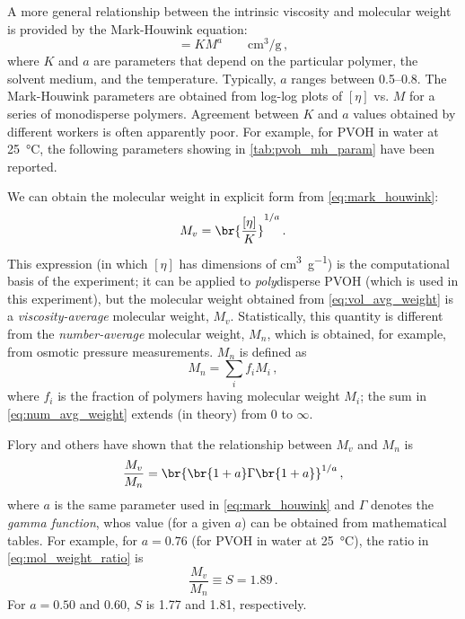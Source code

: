 \documentclass[nobib,nofonts,nols,nohyper]{tufte-handout}
\begin{document}
A more general relationship between the intrinsic viscosity and molecular weight is provided by the Mark-Houwink equation:
\begin{equation}
	[\eta] = K M^a \qquad \si{\cm\cubed \per \g} \, ,
	\label{eq:mark_houwink}
\end{equation}
where \( K \) and \( a \) are parameters that depend on the particular polymer, the solvent medium, and the temperature. 
Typically, \( a \) ranges between \numrange{0.5}{0.8}. 
The Mark-Houwink parameters are obtained from log-log plots of \( [\eta] \) vs. \( M \) for a series of monodisperse polymers. 
Agreement between \( K \) and \( a \) values obtained by different workers is often apparently poor.\cite{immergut75} 
For example, for PVOH in water at \SI{25}{\celsius}, the following parameters showing in \cref{tab:pvoh_mh_param} have been reported. 

We can obtain the molecular weight in explicit form from \cref{eq:mark_houwink}:
\begin{equation}
	M_v = \br{\frac{[\eta]}{K}}^{1/a} \, .
	\label{eq:vol_avg_weight}
\end{equation}
This expression (in which \( [\eta] \) has dimensions of \si{\cm\cubed \per \g}) is the computational basis of the experiment; it can be applied to \emph{poly}disperse PVOH (which is used in this experiment), but the molecular weight obtained from \cref{eq:vol_avg_weight} is a \emph{viscosity-average} molecular weight, \( M_v \). 
Statistically, this quantity is different from the \emph{number-average} molecular weight, \( M_n \), which is obtained, for example, from osmotic pressure measurements. 
\( M_n \) is defined as 
\begin{equation}
	M_n = \sum_i f_i M_i \, ,
	\label{eq:num_avg_weight}
\end{equation}
where \( f_i \) is the fraction of polymers having molecular weight \( M_i \); the sum in \cref{eq:num_avg_weight} extends (in theory) from \num{0} to \( \infty \). 

Flory and others\cite{schaefgen48} have shown that the relationship between \( M_v \) and \( M_n \) is
\begin{equation}
	\frac{M_v}{M_n} = \br{\br{1 + a} \Gamma\br{1 + a}}^{1/a} \, ,
	\label{eq:mol_weight_ratio}
\end{equation}
where \( a \) is the same parameter used in \cref{eq:mark_houwink} and \( \Gamma \) denotes the \emph{gamma function}, whos value (for a given \( a \)) can be obtained from mathematical tables. 
For example, for \( a = 0.76 \) (for PVOH in water at \SI{25}{\celsius}),\cite{flory48} the ratio in \cref{eq:mol_weight_ratio} is 
\begin{equation}
	\frac{M_v}{M_n} \equiv S = 1.89 \, .
	\label{eq:mol_weight_ratio_ex}
\end{equation}
For \( a = 0.50 \) and \num{0.60}, \( S \) is \num{1.77} and \num{1.81}, respectively. 
\end{document}
